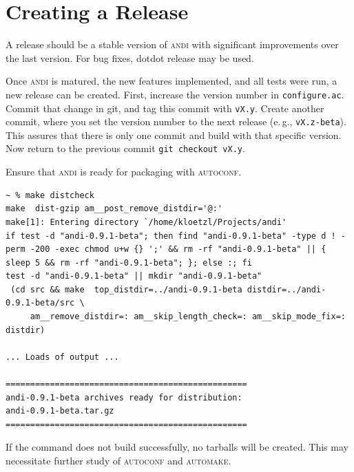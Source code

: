 \documentclass[a4paper,
  10pt,
  english,
  DIV=12,
  BCOR=8mm]{scrbook}
\newcommand{\algo}[1]{\textsc{{#1}}}
\newcommand{\andi}{\algo{andi} }
\begin{document}
\section{Creating a Release}

A release should be a stable version of \andi with significant improvements over the last version. For bug fixes, dotdot release may be used.


Once \andi is matured, the new features implemented, and all tests were run, a new release can be created. First, increase the version number in \lstinline$configure.ac$. Commit that change in git, and tag this commit with \lstinline$vX.y$. Create another commit, where you set the version number to the next release (e.\,g., \lstinline$vX.z-beta$). This assures that there is only one commit and build with that specific version. Now return to the previous commit \lstinline$git checkout vX.y$.

Ensure that \andi is ready for packaging with \algo{autoconf}.

\begin{lstlisting}
~ % make distcheck
make  dist-gzip am__post_remove_distdir='@:'
make[1]: Entering directory `/home/kloetzl/Projects/andi'
if test -d "andi-0.9.1-beta"; then find "andi-0.9.1-beta" -type d ! -perm -200 -exec chmod u+w {} ';' && rm -rf "andi-0.9.1-beta" || { sleep 5 && rm -rf "andi-0.9.1-beta"; }; else :; fi
test -d "andi-0.9.1-beta" || mkdir "andi-0.9.1-beta"
 (cd src && make  top_distdir=../andi-0.9.1-beta distdir=../andi-0.9.1-beta/src \
     am__remove_distdir=: am__skip_length_check=: am__skip_mode_fix=: distdir)

... Loads of output ...

=================================================
andi-0.9.1-beta archives ready for distribution: 
andi-0.9.1-beta.tar.gz
=================================================
\end{lstlisting}

If the command does not build successfully, no tarballs will be created. This may necessitate further study of \algo{autoconf} and \algo{automake}. 



\backmatter

\end{document}
